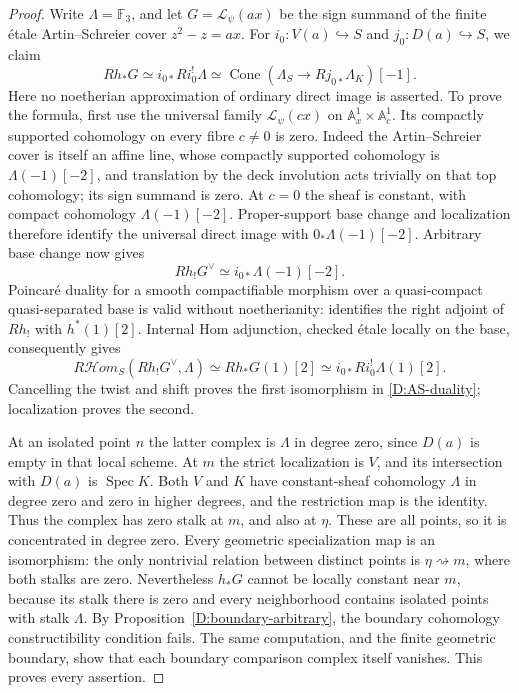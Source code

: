 \begin{proof}
Write $\Lambda=\mathbb F_3$, and let
$G=\mathcal L_\psi(ax)$ be the sign summand of the finite \'etale
Artin--Schreier cover $z^2-z=ax$. For $i_0:V(a)\hookrightarrow S$
and $j_0:D(a)\hookrightarrow S$, we claim
\begin{equation}\label{D:AS-duality}
 Rh_*G \simeq i_{0*}Ri_0^!\Lambda
 \simeq \operatorname{Cone}(\Lambda_S\longrightarrow
 Rj_{0*}\Lambda_K)[-1].
\end{equation}
Here no noetherian approximation of ordinary direct image is asserted.
To prove the formula, first use the universal family
$\mathcal L_\psi(cx)$ on $\mathbb A^1_x\times\mathbb A^1_c$.
Its compactly supported cohomology on every fibre $c\ne0$ is zero.
Indeed the Artin--Schreier cover is itself an affine line, whose
compactly supported cohomology is $\Lambda(-1)[-2]$, and translation
by the deck involution acts trivially on that top cohomology; its
sign summand is zero. At $c=0$ the sheaf is constant, with compact
cohomology $\Lambda(-1)[-2]$. Proper-support base change and localization
therefore identify the universal direct image with
$0_*\Lambda(-1)[-2]$. Arbitrary base change
\cite[XVII, Theorem 5.2.6, p.~357]{SGA4D} now gives
\[
 Rh_!G^\vee\simeq i_{0*}\Lambda(-1)[-2].
\]
Poincar\'e duality for a smooth compactifiable morphism over a
quasi-compact quasi-separated base is valid without noetherianity:
\cite[XVIII, Theorem 3.2.5, pp.~585--586]{SGA4D} identifies the right
adjoint of $Rh_!$ with $h^*(1)[2]$. Internal Hom adjunction, checked
\'etale locally on the base, consequently gives
\[
 R\mathcal Hom_S(Rh_!G^\vee,\Lambda)
 \simeq Rh_*G(1)[2]
 \simeq i_{0*}Ri_0^!\Lambda(1)[2].
\]
Cancelling the twist and shift proves the first isomorphism in
\eqref{D:AS-duality}; localization proves the second.

At an isolated point $n$ the latter complex is $\Lambda$ in degree
zero, since $D(a)$ is empty in that local scheme. At $m$ the strict
localization is $V$, and its intersection with $D(a)$ is
$\operatorname{Spec}K$. Both $V$ and $K$ have constant-sheaf
cohomology $\Lambda$ in degree zero and zero in higher degrees,
and the restriction map is the identity. Thus the complex has zero
stalk at $m$, and also at $\eta$. These are all points, so it is
concentrated in degree zero. Every geometric specialization map is
an isomorphism: the only nontrivial relation between distinct points
is $\eta\rightsquigarrow m$, where both stalks are zero. Nevertheless
$h_*G$ cannot be locally constant near $m$, because its stalk there
is zero and every neighborhood contains isolated points with stalk
$\Lambda$. By Proposition~\ref{D:boundary-arbitrary}, the boundary
cohomology constructibility condition fails. The same computation,
and the finite geometric boundary, show that each boundary comparison
complex itself vanishes. This proves every assertion.
\end{proof}

